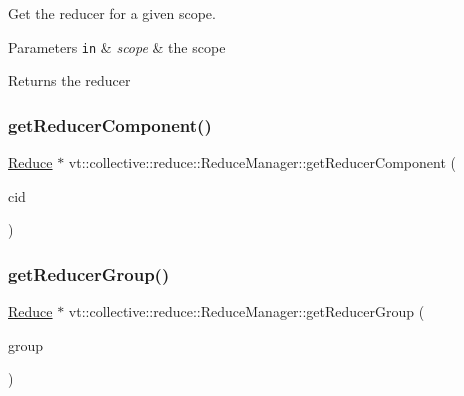 Get the reducer for a given scope. 


\begin{DoxyParams}[1]{Parameters}
\mbox{\tt in}  & {\em scope} & the scope\\
\hline
\end{DoxyParams}
\begin{DoxyReturn}{Returns}
the reducer 
\end{DoxyReturn}
\mbox{\label{structvt_1_1collective_1_1reduce_1_1_reduce_manager_ae154a987a32dfa8c86e0391a2915579d}} 
\subsubsection{\texorpdfstring{get\+Reducer\+Component()}{getReducerComponent()}}
{\footnotesize\ttfamily \hyperlink{structvt_1_1collective_1_1reduce_1_1_reduce}{Reduce} $\ast$ vt\+::collective\+::reduce\+::\+Reduce\+Manager\+::get\+Reducer\+Component (\begin{DoxyParamCaption}\item[{\hyperlink{namespacevt_ab6ac935c168b809c422d5121da4f2700}{Component\+I\+D\+Type} const \&}]{cid }\end{DoxyParamCaption})}

\mbox{\label{structvt_1_1collective_1_1reduce_1_1_reduce_manager_afedfe0dbb9fcbe6120a310ac8f4ad9b0}} 
\subsubsection{\texorpdfstring{get\+Reducer\+Group()}{getReducerGroup()}}
{\footnotesize\ttfamily \hyperlink{structvt_1_1collective_1_1reduce_1_1_reduce}{Reduce} $\ast$ vt\+::collective\+::reduce\+::\+Reduce\+Manager\+::get\+Reducer\+Group (\begin{DoxyParamCaption}\item[{\hyperlink{namespacevt_a27b5e4411c9b6140c49100e050e2f743}{Group\+Type} const \&}]{group }\end{DoxyParamCaption})}

